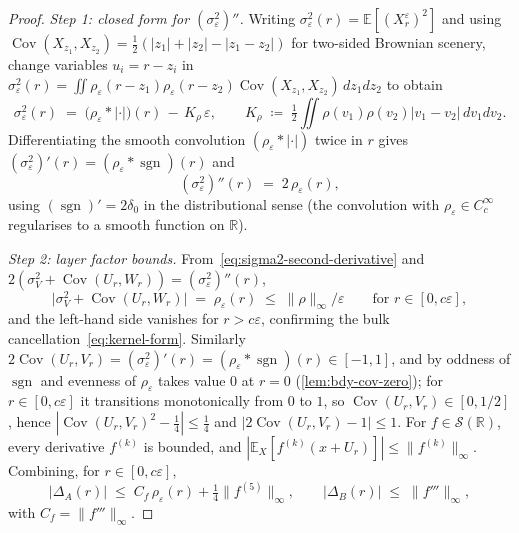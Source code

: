 \documentclass[11pt,reqno]{amsart}
\theoremstyle{plain}
\theoremstyle{definition}
\theoremstyle{remark}
\newcommand{\R}{\mathbb{R}}
\newcommand{\E}{\mathbb{E}}
\DeclareMathOperator{\Cov}{Cov}
\DeclareMathOperator{\sgn}{sgn}
\begin{document}
\begin{proof}
\emph{Step 1: closed form for $(\sigma_{\varepsilon}^{2})''$.}
Writing $\sigma_{\varepsilon}^{2}(r)=\E[(X_{r}^{\varepsilon})^{2}]$
and using $\Cov(X_{z_{1}},X_{z_{2}})=\tfrac12(|z_{1}|+|z_{2}|-|z_{1}-z_{2}|)$
for two-sided Brownian scenery, change variables
$u_{i}=r-z_{i}$ in
$\sigma_{\varepsilon}^{2}(r)=\iint\rho_{\varepsilon}(r-z_{1})\rho_{\varepsilon}(r-z_{2})\Cov(X_{z_{1}},X_{z_{2}})\,dz_{1}dz_{2}$
to obtain
\begin{equation}\label{eq:sigma2-closed-form}
 \sigma_{\varepsilon}^{2}(r)
 \;=\;\bigl(\rho_{\varepsilon}*|\cdot|\bigr)(r)\,-\,K_{\rho}\,\varepsilon,
 \qquad
 K_{\rho}\;\coloneqq\;\tfrac12\!\iint\rho(v_{1})\rho(v_{2})|v_{1}-v_{2}|\,dv_{1}dv_{2}.
\end{equation}
Differentiating the smooth convolution
$(\rho_{\varepsilon}*|\cdot|)$ twice in $r$ gives
$(\sigma_{\varepsilon}^{2})'(r)=(\rho_{\varepsilon}*\sgn)(r)$ and
\begin{equation}\label{eq:sigma2-second-derivative}
 (\sigma_{\varepsilon}^{2})''(r)\;=\;2\,\rho_{\varepsilon}(r),
\end{equation}
using $(\sgn)'=2\delta_{0}$ in the distributional sense (the
convolution with $\rho_{\varepsilon}\in C_{c}^{\infty}$ regularises
to a smooth function on $\R$).

\emph{Step 2: layer factor bounds.}
From~\eqref{eq:sigma2-second-derivative} and
$2(\sigma_{V}^{2}+\Cov(U_{r},W_{r}))=(\sigma_{\varepsilon}^{2})''(r)$,
\begin{equation}\label{eq:sigmaV-W-bound}
 \bigl|\sigma_{V}^{2}+\Cov(U_{r},W_{r})\bigr|
 \;=\;\rho_{\varepsilon}(r)
 \;\le\;\|\rho\|_{\infty}/\varepsilon
 \qquad\text{for }r\in[0,c\varepsilon],
\end{equation}
and the left-hand side vanishes for $r>c\varepsilon$, confirming
the bulk cancellation~\eqref{eq:kernel-form}. Similarly
$2\Cov(U_{r},V_{r})=(\sigma_{\varepsilon}^{2})'(r)=(\rho_{\varepsilon}*\sgn)(r)\in[-1,1]$,
and by oddness of $\sgn$ and evenness of $\rho_{\varepsilon}$ takes
value $0$ at $r=0$ (\cref{lem:bdy-cov-zero}); for $r\in[0,c\varepsilon]$
it transitions monotonically from $0$ to $1$, so
$\Cov(U_{r},V_{r})\in[0,1/2]$, hence
$|\Cov(U_{r},V_{r})^{2}-\tfrac14|\le\tfrac14$ and
$|2\Cov(U_{r},V_{r})-1|\le 1$. For $f\in\mathscr S(\R)$, every
derivative $f^{(k)}$ is bounded, and
$|\E_{X}[f^{(k)}(x+U_{r})]|\le\|f^{(k)}\|_{\infty}$. Combining,
for $r\in[0,c\varepsilon]$,
\begin{equation}\label{eq:Delta-bounds}
 |\Delta_{A}(r)|\;\le\;C_{f}\,\rho_{\varepsilon}(r)+\tfrac14\|f^{(5)}\|_{\infty},
 \qquad
 |\Delta_{B}(r)|\;\le\;\|f'''\|_{\infty},
\end{equation}
with $C_{f}=\|f'''\|_{\infty}$.


\end{proof}
\end{document}

